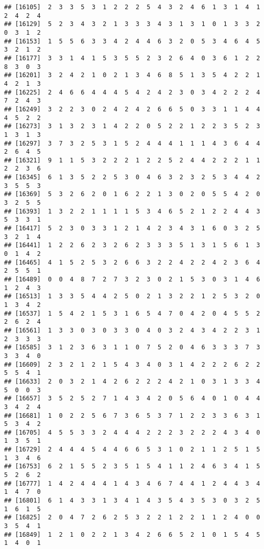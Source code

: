 \documentclass[
]{article}
\begin{document}
\begin{verbatim}
## [16105]  2  3  3  5  3  1  2  2  2  5  4  3  2  4  6  1  3  1  4  1  2  4  2  4
## [16129]  5  2  3  4  3  2  1  3  3  3  4  3  1  3  1  0  1  3  3  2  0  3  1  2
## [16153]  1  5  5  6  3  3  4  2  4  4  6  3  2  0  5  3  4  6  4  5  3  2  1  2
## [16177]  3  3  1  4  1  5  3  5  5  2  3  2  6  4  0  3  6  1  2  2  8  3  0  3
## [16201]  3  2  4  2  1  0  2  1  3  4  6  8  5  1  3  5  4  2  2  1  4  2  1  3
## [16225]  2  4  6  6  4  4  4  5  4  2  4  2  3  0  3  4  2  2  2  4  7  2  4  3
## [16249]  3  2  2  3  0  2  4  2  4  2  6  6  5  0  3  3  1  1  4  4  4  5  2  2
## [16273]  3  1  3  2  3  1  4  2  2  0  5  2  2  1  2  2  3  5  2  3  1  3  1  3
## [16297]  3  7  3  2  5  3  1  5  2  4  4  4  1  1  1  4  3  6  4  4  2  6  4  5
## [16321]  9  1  1  5  3  2  2  2  1  2  2  5  2  4  4  2  2  2  1  1  2  2  3  6
## [16345]  6  1  3  5  2  2  5  3  0  4  6  3  2  3  2  5  3  4  4  2  3  5  5  3
## [16369]  5  3  2  6  2  0  1  6  2  2  1  3  0  2  0  5  5  4  2  0  3  2  5  5
## [16393]  1  3  2  2  1  1  1  1  5  3  4  6  5  2  1  2  2  4  4  3  5  3  3  1
## [16417]  5  2  3  0  3  3  1  2  1  4  2  3  4  3  1  6  0  3  2  5  3  2  1  4
## [16441]  1  2  2  6  2  3  2  6  2  3  3  3  5  1  3  1  5  6  1  3  0  1  4  2
## [16465]  4  1  5  2  5  3  2  6  6  3  2  2  4  2  2  4  2  3  6  4  2  5  5  1
## [16489]  0  0  4  8  7  2  7  3  2  3  0  2  1  5  3  0  3  1  4  6  1  2  4  3
## [16513]  1  3  3  5  4  4  2  5  0  2  1  3  2  2  1  2  5  3  2  0  1  3  4  2
## [16537]  1  5  4  2  1  5  3  1  6  5  4  7  0  4  2  0  4  5  5  2  2  6  2  4
## [16561]  1  3  3  0  3  0  3  3  0  4  0  3  2  4  3  4  2  2  3  1  2  3  3  3
## [16585]  3  1  2  3  6  3  1  1  0  7  5  2  0  4  6  3  3  3  7  3  3  3  4  0
## [16609]  2  3  2  1  2  1  5  4  3  4  0  3  1  4  2  2  2  6  2  2  5  5  4  1
## [16633]  2  0  3  2  1  4  2  6  2  2  2  4  2  1  0  3  1  3  3  4  5  0  0  3
## [16657]  3  5  2  5  2  7  1  4  3  4  2  0  5  6  4  0  1  0  4  4  3  4  2  4
## [16681]  1  0  2  2  5  6  7  3  6  5  3  7  1  2  2  3  3  6  3  1  5  3  4  2
## [16705]  4  5  5  3  3  2  4  4  4  2  2  2  3  2  2  2  4  3  4  0  1  3  5  1
## [16729]  2  4  4  4  5  4  4  6  6  5  3  1  0  2  1  1  2  5  1  5  1  3  4  6
## [16753]  6  2  1  5  5  2  3  5  1  5  4  1  1  2  4  6  3  4  1  5  5  2  6  2
## [16777]  1  4  2  4  4  4  1  4  3  4  6  7  4  4  1  2  4  4  3  4  1  4  7  0
## [16801]  6  1  4  3  3  1  3  4  1  4  3  5  4  3  5  3  0  3  2  5  1  6  1  5
## [16825]  2  0  4  7  2  6  2  5  3  2  2  1  2  2  1  1  2  4  0  0  3  5  4  1
## [16849]  1  2  1  0  2  2  1  3  4  2  6  6  5  2  1  0  1  5  4  5  1  4  0  1

\end{verbatim}
\end{document}
